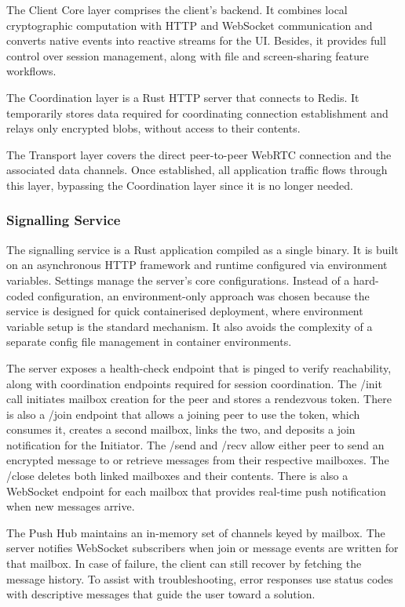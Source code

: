 \documentclass[12pt,a4paper]{article}
\begin{document}
The Client Core layer comprises the client’s backend. It combines local cryptographic computation with HTTP and WebSocket communication and converts native events into reactive streams for the UI. Besides, it provides full control over session management, along with file and screen-sharing feature workflows.

The Coordination layer is a Rust HTTP server that connects to Redis. It temporarily stores data required for coordinating connection establishment and relays only encrypted blobs, without access to their contents.

The Transport layer covers the direct peer-to-peer WebRTC connection and the associated data channels. Once established, all application traffic flows through this layer, bypassing the Coordination layer since it is no longer needed.

\subsubsection{Signalling Service}

The signalling service is a Rust application compiled as a single binary. It is built on an asynchronous HTTP framework and runtime configured via environment variables. Settings manage the server’s core configurations. Instead of a hard-coded configuration, an environment-only approach was chosen because the service is designed for quick containerised deployment, where environment variable setup is the standard mechanism. It also avoids the complexity of a separate config file management in container environments.

The server exposes a health-check endpoint that is pinged to verify reachability, along with coordination endpoints required for session coordination. The /init call initiates mailbox creation for the peer and stores a rendezvous token. There is also a /join endpoint that allows a joining peer to use the token, which consumes it, creates a second mailbox, links the two, and deposits a join notification for the Initiator. The /send and /recv allow either peer to send an encrypted message to or retrieve messages from their respective mailboxes. The /close deletes both linked mailboxes and their contents. There is also a WebSocket endpoint for each mailbox that provides real-time push notification when new messages arrive.

The Push Hub maintains an in-memory set of channels keyed by mailbox. The server notifies WebSocket subscribers when join or message events are written for that mailbox. In case of failure, the client can still recover by fetching the message history. To assist with troubleshooting, error responses use status codes with descriptive messages that guide the user toward a solution.
\end{document}
